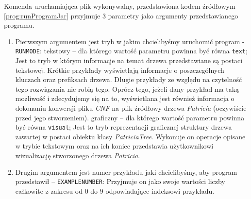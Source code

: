     	Komenda uruchamiająca plik wykonywalny, przedstawiona kodem źródłowym \ref{prog:runProgramJar} przyjmuje 3 parametry jako argumenty przedstawianego programu. 
    	\begin{enumerate}
    	    \item Pierwszym argumentem jest tryb w jakim chcielibyśmy uruchomić program - \texttt{RUN\textunderscore MODE}: 
    	        \subitem tekstowy -- dla którego wartość parametru powinna być równa \texttt{text};\newline
    	        Jest to tryb w którym informacje na temat drzewa przedstawiane są postaci tekstowej. Krótkie przykłady wyświetlają informacje o poszczególnych kluczach oraz prefiksach drzewa. Długie przykłady ze względu na czytelność tego rozwiązania nie robią tego. Oprócz tego, jeżeli dany przykład ma taką możliwość i zdecydujemy się na to, wyświetlana jest również informacja o dokonaniu konwersji pliku \emph{CNF} na plik źródłowy drzewa \emph{Patricia} (oczywiście przed jego stworzeniem).
    	        \subitem graficzny -- dla którego wartość parametru powinna być równa \texttt{visual};\newline
    	        Jest to tryb reprezentacji graficznej struktury drzewa zawartej w postaci obiektu klasy \emph{PatriciaTree}. Wykonuje on operacje opisane w trybie tekstowym oraz na ich koniec przedstawia użytkownikowi wizualizację stworzonego drzewa \emph{Patricia}.
    	   \item Drugim argumentem jest numer przykładu jaki chcielibyśmy, aby program przedstawił -- \texttt{EXAMPLE\textunderscore NUMBER}:
    	        \subitem Przyjmuje on jako swoje wartości liczby całkowite z zakresu od $0$ do $9$ odpowiadające indeksowi przykładu. \newline
    	        

\end{enumerate}
